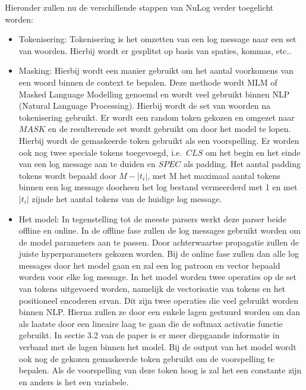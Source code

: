Hieronder zullen nu de verschillende stappen van NuLog verder toegelicht worden:
\begin{itemize}
    \item Tokenisering: Tokenisering is het omzetten van een log message naar een set van woorden. Hierbij wordt er gesplitst op basis van spaties, kommas, etc..\\
    
    \item Masking: Hierbij wordt een manier gebruikt om het aantal voorkomens van een woord binnen de context te bepalen. Deze methode wordt MLM of Masked Language Modelling genoemd en wordt veel gebruikt binnen NLP (Natural Language Processing). Hierbij wordt de set van woorden na tokenisering gebruikt. Er wordt een random token gekozen en omgezet naar $MASK$ en de resulterende set wordt gebruikt om door het model te lopen. Hierbij wordt de gemaskeerde token gebruikt als een voorspelling. Er worden ook nog twee speciale tokens toegevoegd, i.e.\ $CLS$ om het begin en het einde van een log message aan te duiden en $SPEC$ als padding. Het aantal padding tokens wordt bepaald door $M-\lvert t_{i} \rvert$, met M het maximaal aantal tokens binnen een log message doorheen het log bestand vermeerderd met 1 en met $\lvert t_{i} \rvert$ zijnde het aantal tokens van de huidige log message.\\
    
    \item Het model: In tegenstelling tot de meeste parsers werkt deze parser beide offline en online. In de offline fase zullen de log messages gebruikt worden om de model parameters aan te passen. Door achterwaartse propagatie zullen de juiste hyperparameters gekozen worden. Bij de online fase zullen dan alle log messages door het model gaan en zal een log patroon en vector bepaald worden voor elke log message. In het model worden twee operaties op de set van tokens uitgevoerd worden, namelijk de vectorisatie van tokens en het positioneel encoderen ervan. Dit zijn twee operaties die veel gebruikt worden binnen NLP. Hierna zullen ze door een enkele lagen gestuurd worden om dan als laatste door een lineaire laag te gaan die de softmax activatie functie gebruikt. In sectie 3.2 van de paper is er meer diepgaande informatie in verband met de lagen binnen het model. Bij de output van het model wordt ook nog de gekozen gemaskeerde token gebruikt om de voorspelling te bepalen. Als de voorspelling van deze token hoog is zal het een constante zijn en anders is het een variabele.
\end{itemize}

